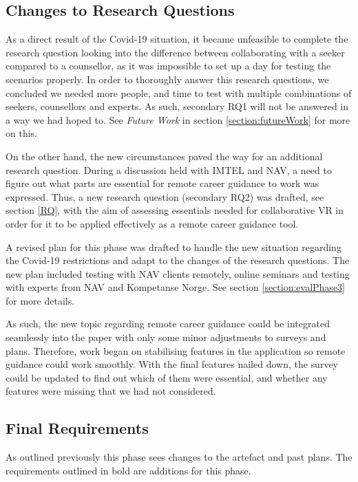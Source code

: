 \subsection{Changes to Research Questions}
As a direct result of the Covid-19 situation, it became unfeasible to complete the research question looking into the difference between collaborating with a seeker compared to a counsellor, as it was impossible to set up a day for testing the scenarios properly. In order to thoroughly answer this research questions, we concluded we needed more people, and time to test with multiple combinations of seekers, counsellors and experts. As such, secondary RQ1 will not be answered in a way we had hoped to. See \textit{Future Work} in section \ref{section:futureWork} for more on this.

On the other hand, the new circumstances paved the way for an additional research question. During a discussion held with IMTEL and NAV, a need to figure out what parts are essential for remote career guidance to work was expressed. Thus, a new research question (secondary RQ2) was drafted, see section \ref{RQ}, with the aim of assessing essentials needed for collaborative VR in order for it to be applied effectively as a remote career guidance tool. 

A revised plan for this phase was drafted to handle the new situation regarding the Covid-19 restrictions and adapt to the changes of the research questions. The new plan included testing with NAV clients remotely, online seminars and testing with experts from NAV and Kompetanse Norge. See section \ref{section:evalPhase3} for more details.    

As such, the new topic regarding remote career guidance could be integrated seamlessly into the paper with only some minor adjustments to surveys and plans. Therefore, work began on stabilising features in the application so remote guidance could work smoothly. With the final features nailed down, the survey could be updated to find out which of them were essential, and whether any features were missing that we had not considered.


\subsection{Final Requirements}
As outlined previously this phase sees changes to the artefact and past plans. The requirements outlined in bold are additions for this phase.

